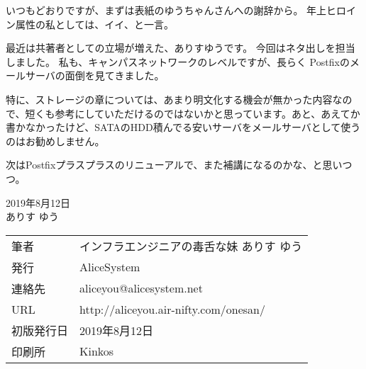 いつもどおりですが、まずは表紙のゆうちゃんさんへの謝辞から。
年上ヒロイン属性の私としては、イイ、と一言。

最近は共著者としての立場が増えた、ありすゆうです。
今回はネタ出しを担当しました。
私も、キャンパスネットワークのレベルですが、長らく	Postfixのメールサーバの面倒を見てきました。

特に、ストレージの章については、あまり明文化する機会が無かった内容なので、短くも参考にしていただけるのではないかと思っています。あと、あえてか書かなかったけど、SATAのHDD積んでる安いサーバをメールサーバとして使うのはお勧めしません。

次はPostfixプラスプラスのリニューアルで、また補講になるのかな、と思いつつ。

\begin{flushright}
2019年8月12日 \\
ありす ゆう
\end{flushright}







\vspace*{\fill}
\begin{tabular}{ll} \toprule
筆者 & インフラエンジニアの毒舌な妹 ありす ゆう\\
発行 & AliceSystem \\
連絡先 & aliceyou@alicesystem.net \\
URL & http://aliceyou.air-nifty.com/onesan/ \\
初版発行日 & 2019年8月12日 \\
印刷所 & Kinkos  \\ \bottomrule
\end{tabular}